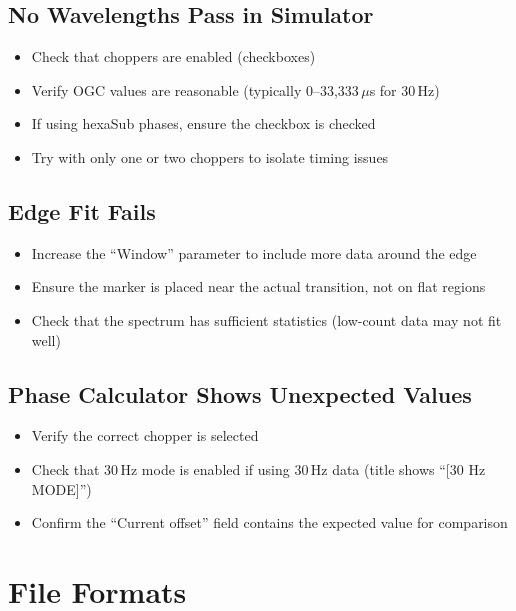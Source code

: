 \documentclass[11pt,letterpaper]{article}
\begin{document}
\subsection{No Wavelengths Pass in Simulator}

\begin{itemize}
    \item Check that choppers are enabled (checkboxes)
    \item Verify OGC values are reasonable (typically 0--33,333\,$\mu$s for 30\,Hz)
    \item If using hexaSub phases, ensure the checkbox is checked
    \item Try with only one or two choppers to isolate timing issues
\end{itemize}

\subsection{Edge Fit Fails}

\begin{itemize}
    \item Increase the ``Window'' parameter to include more data around the edge
    \item Ensure the marker is placed near the actual transition, not on flat regions
    \item Check that the spectrum has sufficient statistics (low-count data may not fit well)
\end{itemize}

\subsection{Phase Calculator Shows Unexpected Values}

\begin{itemize}
    \item Verify the correct chopper is selected
    \item Check that 30\,Hz mode is enabled if using 30\,Hz data (title shows ``[30 Hz MODE]'')
    \item Confirm the ``Current offset'' field contains the expected value for comparison
\end{itemize}

\section{File Formats}
\end{document}
